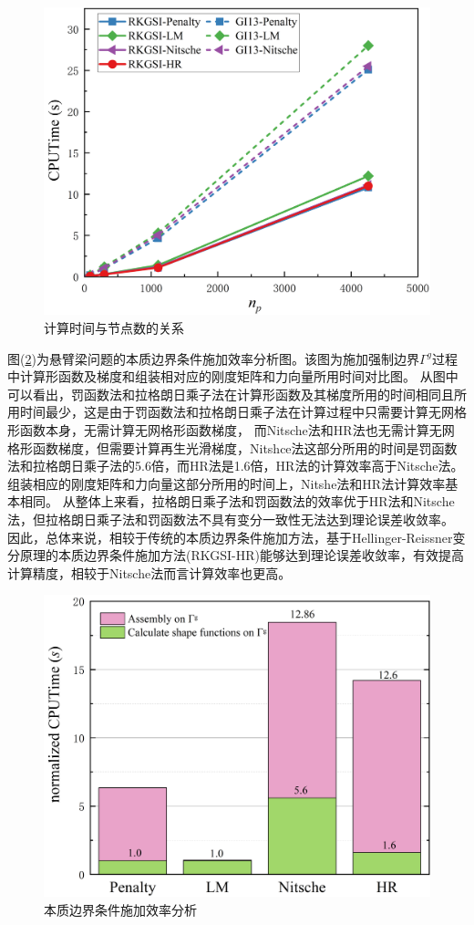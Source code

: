 \begin{figure}[!h]
    \centering
    \includegraphics[scale=0.5]{figure/cantilever/CPUTime.png}
    \caption{计算时间与节点数的关系}\label{CCPUTime}
\end{figure}\newpage
图(\ref{Ccaculate})为悬臂梁问题的本质边界条件施加效率分析图。该图为施加强制边界$\Gamma^g$过程中计算形函数及梯度和组装相对应的刚度矩阵和力向量所用时间对比图。
从图中可以看出，罚函数法和拉格朗日乘子法在计算形函数及其梯度所用的时间相同且所用时间最少，这是由于罚函数法和拉格朗日乘子法在计算过程中只需要计算无网格形函数本身，无需计算无网格形函数梯度，
而Nitsche法和HR法也无需计算无网格形函数梯度，但需要计算再生光滑梯度，Nitshce法这部分所用的时间是罚函数法和拉格朗日乘子法的5.6倍，而HR法是1.6倍，HR法的计算效率高于Nitsche法。
组装相应的刚度矩阵和力向量这部分所用的时间上，Nitshe法和HR法计算效率基本相同。
从整体上来看，拉格朗日乘子法和罚函数法的效率优于HR法和Nitsche法，但拉格朗日乘子法和罚函数法不具有变分一致性无法达到理论误差收敛率。
因此，总体来说，相较于传统的本质边界条件施加方法，基于Hellinger-Reissner变分原理的本质边界条件施加方法(RKGSI-HR)能够达到理论误差收敛率，有效提高计算精度，相较于Nitsche法而言计算效率也更高。
\begin{figure}[!h]
    \centering
    \includegraphics[scale=0.5]{figure/cantilever/caculate.png}
    \caption{本质边界条件施加效率分析}\label{Ccaculate}
\end{figure}\newpage
